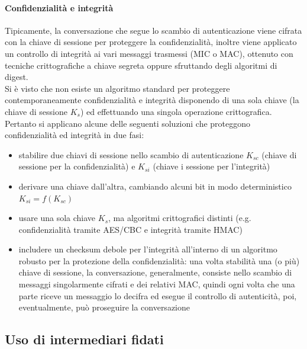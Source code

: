 \paragraph{Confidenzialità e integrità}
Tipicamente, la conversazione che segue lo scambio di autenticazione viene cifrata con la chiave di sessione per proteggere la confidenzialità, inoltre viene applicato un controllo di integrità ai vari messaggi trasmessi (MIC o MAC), ottenuto con tecniche crittografiche a chiave segreta oppure sfruttando degli algoritmi di digest.\\
Si è visto che non esiste un algoritmo standard per proteggere contemporaneamente confidenzialità e integrità disponendo di una sola chiave (la chiave di sessione $K_{s}$) ed effettuando una singola operazione crittografica. Pertanto si applicano alcune delle seguenti soluzioni che proteggono confidenzialità ed integrità in due fasi:
\begin{itemize}
	\item stabilire due chiavi di sessione nello scambio di autenticazione $K_{sc}$ (chiave di sessione per la confidenzialità) e $K_{si}$ (chiave i sessione per l'integrità)
	\item derivare una chiave dall'altra, cambiando alcuni bit in modo deterministico $K_{si} = f(K_{sc})$
	\item usare una sola chiave $K_{s}$, ma algoritmi crittografici distinti (e.g. confidenzialità tramite AES/CBC e integrità tramite HMAC)
	\item includere un checksum debole per l'integrità all'interno di un algoritmo robusto per la protezione della confidenzialità: una volta stabilità una (o più) chiave di sessione, la conversazione, generalmente, consiste nello scambio di messaggi singolarmente cifrati e dei relativi MAC, quindi ogni volta che una parte riceve un messaggio lo decifra ed esegue il controllo di autenticità, poi, eventualmente, può proseguire la conversazione
\end{itemize}

\subsection{Uso di intermediari fidati}
